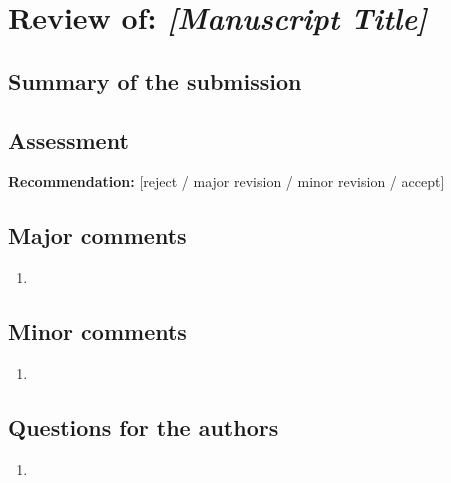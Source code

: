 \documentclass[11pt]{article}
\begin{document}
\section*{Review of: \emph{[Manuscript Title]}}

\subsection*{Summary of the submission}

\subsection*{Assessment}

\noindent\textbf{Recommendation:} [reject / major revision / minor revision / accept]

\subsection*{Major comments}
\begin{enumerate}
  \item
\end{enumerate}

\subsection*{Minor comments}
\begin{enumerate}
  \item
\end{enumerate}

\subsection*{Questions for the authors}
\begin{enumerate}
  \item
\end{enumerate}
\end{document}
